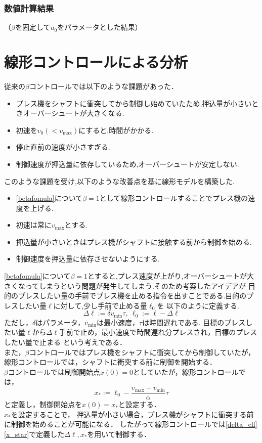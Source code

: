 \documentclass [dvipdfmx] {jsarticle}
\numberwithin{equation}{section}
\theoremstyle{definition} %
\theoremstyle{definition} %
\begin{document}
\subsubsection{数値計算結果}
（$\beta$を固定して$u_0$をパラメータとした結果）
\section{線形コントロールによる分析}
従来の$\beta$コントロールでは以下のような課題があった．
\begin{itemize}
    \item プレス機をシャフトに衝突してから制御し始めていたため,押込量が小さいときオーバーシュートが大きくなる.
    \item 初速を$v_0(<v_{\max})$にすると,時間がかかる.
    \item 停止直前の速度が小さすぎる.
    \item 制御速度が押込量に依存しているため,オーバーシュートが安定しない.
\end{itemize}
このような課題を受け,以下のような改善点を基に線形モデルを構築した.
\begin{itemize}
    \item \eqref{betafomula}について$\beta=1$として線形コントロールすることでプレス機の速度を上げる. 
    \item 初速は常に$v_{\max}$とする.
    \item 押込量が小さいときはプレス機がシャフトに接触する前から制御を始める.
    \item 制御速度を押込量に依存させないようにする.
\end{itemize}
\eqref{betafomula}について$\beta=1$とすると,プレス速度が上がり,オーバーシュートが大きくなってしまうという問題が発生してしまう.そのため考案したアイデアが
目的のプレスしたい量の手前でプレス機を止める指令を出すことである.目的のプレスしたい量$\ell$に対して,少し手前で止める量$\ell_0$を
以下のように定義する.
\begin{equation}\label{delta_ell}
    \Delta\ell :=\delta v_{\min}\tau,\ \ell_0:=\ell-\Delta\ell
\end{equation}
ただし，$\delta$はパラメータ，$v_{\min}$は最小速度，$\tau$は時間遅れである.
目標のプレスしたい量$\ell$から$\Delta\ell$手前で止め，最小速度で時間遅れ分プレスされ，目標のプレスしたい量で止まる
という考えである．\\
また，$\beta$コントロールではプレス機をシャフトに衝突してから制御していたが，線形コントロールでは，シャフトに衝突する前に制御を開始する．\\
$\beta$コントロールでは制御開始点$x(0)=0$としていたが，線形コントロールでは，
\begin{equation}\label{x_star}
    x_\ast:=\ell_0-\displaystyle\frac{v_{\max}-v_{\min}}{\alpha}\tau
\end{equation}
と定義し，制御開始点を$x(0)=x_\ast$と設定する．\\
$x_\ast$を設定することで，
押込量が小さい場合，プレス機がシャフトに衝突する前に制御を始めることが可能になる．
したがって線形コントロールでは\eqref{delta_ell}\eqref{x_star}で定義した$\Delta\ell , x_\ast$を用いて制御する．
\end{document}
